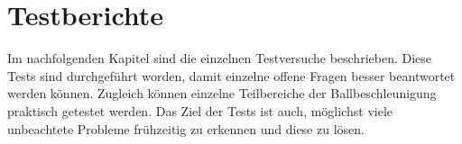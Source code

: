 ﻿\section{Testberichte}
Im nachfolgenden Kapitel sind die einzelnen Testversuche beschrieben. 
Diese Tests sind durchgeführt worden, damit einzelne offene Fragen 
besser beantwortet werden können. Zugleich können einzelne Teilbereiche 
der Ballbeschleunigung praktisch getestet werden. Das Ziel der Tests ist 
auch, möglichst viele unbeachtete Probleme frühzeitig zu erkennen und 
diese zu lösen. 